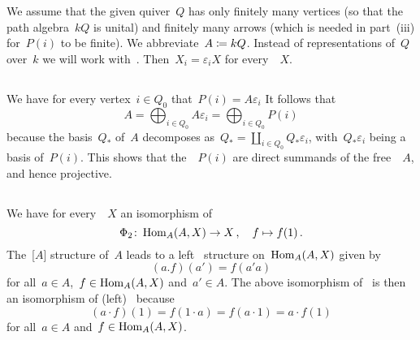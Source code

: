 \section{}

We assume that the given quiver~$Q$ has only finitely many vertices (so that the path algebra~$kQ$ is unital) and finitely many arrows (which is needed in part~(iii) for~$P(i)$ to be finite).
We abbreviate~$A \coloneqq kQ$.
Instead of representations of~$Q$ over~$k$ we will work with~{}.
Then~$X_i = \varepsilon_i X$ for every~{}~$X$.





\addtocounter{subsection}{1}





\subsection{}

We have for every vertex~$i \in Q_0$ that~$P(i) = A \varepsilon_i$
It follows that
\[
    A
  = \bigoplus_{i \in Q_0} A \varepsilon_i
  = \bigoplus_{i \in Q_0} P(i)
\]
because the basis~$Q_*$ of~$A$ decomposes as~$Q_* = \coprod_{i \in Q_0} Q_* \varepsilon_i$, with~$Q_* \varepsilon_i$ being a basis of~$P(i)$.
This shows that the~{}~$P(i)$ are direct summands of the free~{}~$A$, and hence projective.





\addtocounter{subsection}{-2}
\subsection{}

We have for every~{}~$X$ an isomorphism of~{\kvss}
\[
  \Phi_2
  \colon
  \operatorname{Hom}_A(A, X)
  \to
  X \,,
  \quad
  f
  \mapsto
  f(1) \,.
\]
The~{[$A$]} structure of~$A$ leads to a left~{} structure on~$\operatorname{Hom}_A(A,X)$ given by
\[
    (a.f)(a')
  = f(a'a)
\]
for all~$a \in A$,~$f \in \operatorname{Hom}_A(A,X)$ and~$a' \in A$.
The above isomorphism of~{\kvs} is then an isomorphism of (left)~{} because
\[
    (a \cdot f)(1)
  = f(1 \cdot a)
  = f(a \cdot 1)
  = a \cdot f(1)
\]
for all~$a \in A$ and~$f \in \operatorname{Hom}_A(A,X)$.

